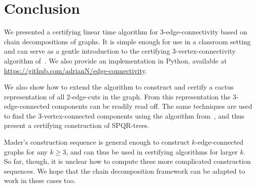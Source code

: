 \documentclass[paper=a4]{scrartcl}
\begin{document}
\section{Conclusion}\label{Conclusion}
We presented a certifying linear time algorithm for 3-edge-connectivity based
on chain decompositions of graphs. It is simple enough for use in a classroom setting and can serve as a gentle introduction to the certifying 3-vertex-connectivity algorithm of~\cite{Schmidt2013}. We also provide an implementation in Python, available at \url{https://github.com/adrianN/edge-connectivity}.

We also show how to extend the algorithm to construct and certify a cactus representation of all 2-edge-cuts in the graph. From this representation the 3-edge-connected components can be readily read off. The same techniques are used to find the 3-vertex-connected components using the algorithm from~\cite{Schmidt2013}, and thus present a certifying construction of SPQR-trees.

Mader's construction sequence is general enough to construct $k$-edge-connected graphs for any $k\geq 3$, and can thus be used in certifying algorithms for larger $k$. So far, though, it is unclear how to compute these more complicated construction sequences. We hope that the chain decomposition framework can be adapted to work in these cases too.
\end{document}
